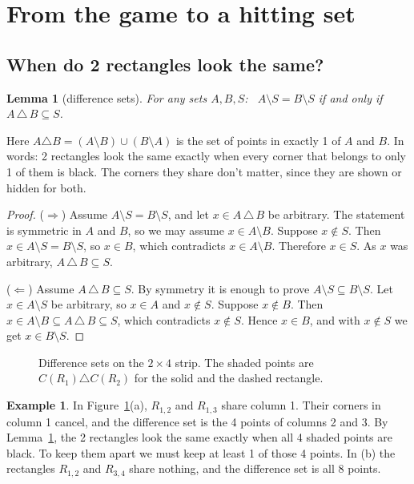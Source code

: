 \documentclass[11pt]{article}
\newtheorem{lemma}[theorem]{Lemma}
\theoremstyle{definition}
\newtheorem{example}[theorem]{Example}
\theoremstyle{remark}
\begin{document}
\section{From the game to a hitting set}\label{sec:reduction}

\subsection{When do 2 rectangles look the same?}

\begin{lemma}[difference sets]\label{lem:reduction}
For any sets $A,B,S$: \ $A\setminus S=B\setminus S$ if and only if $A\,\triangle\,B\subseteq S$.
\end{lemma}

Here $A\triangle B=(A\setminus B)\cup(B\setminus A)$ is the set of points in exactly 1 of $A$ and
$B$. In words: 2 rectangles look the same exactly when every corner that belongs to only 1 of
them is black. The corners they share don't matter, since they are shown or hidden for both.

\begin{proof}
($\Rightarrow$) Assume $A\setminus S=B\setminus S$, and let $x\in A\,\triangle\,B$ be arbitrary.
The statement is symmetric in $A$ and $B$, so we may assume $x\in A\setminus B$. Suppose
$x\notin S$. Then $x\in A\setminus S=B\setminus S$, so $x\in B$, which contradicts
$x\in A\setminus B$. Therefore $x\in S$. As $x$ was arbitrary, $A\,\triangle\,B\subseteq S$.

($\Leftarrow$) Assume $A\,\triangle\,B\subseteq S$. By symmetry it is enough to prove
$A\setminus S\subseteq B\setminus S$. Let $x\in A\setminus S$ be arbitrary, so $x\in A$ and
$x\notin S$. Suppose $x\notin B$. Then $x\in A\setminus B\subseteq A\,\triangle\,B\subseteq S$,
which contradicts $x\notin S$. Hence $x\in B$, and with $x\notin S$ we get $x\in B\setminus S$.
\end{proof}

\begin{figure}[htbp]
\centering

\caption{Difference sets on the $2\times4$ strip. The shaded points are $C(R_1)\triangle
C(R_2)$ for the solid and the dashed rectangle.}
\label{fig:difference}
\end{figure}

\begin{example}
In Figure~\ref{fig:difference}(a), $R_{1,2}$ and $R_{1,3}$ share column 1. Their corners in
column 1 cancel, and the difference set is the 4 points of columns 2 and 3. By
Lemma~\ref{lem:reduction}, the 2 rectangles look the same exactly when all 4 shaded points are
black. To keep them apart we must keep at least 1 of those 4 points. In (b) the rectangles
$R_{1,2}$ and $R_{3,4}$ share nothing, and the difference set is all 8 points.
\end{example}
\end{document}
